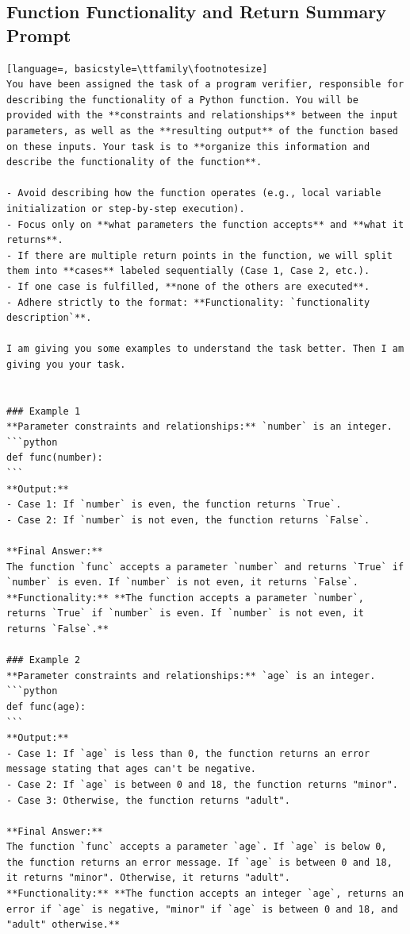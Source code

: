 \documentclass[sigconf]{acmart}
\begin{document}
\subsection{Function Functionality and Return Summary Prompt}
\label{functionality_prompt}
\begin{tcolorbox}[ colback=gray!10, colframe=black, arc=5pt]
\begin{lstlisting}[language=, basicstyle=\ttfamily\footnotesize]
You have been assigned the task of a program verifier, responsible for describing the functionality of a Python function. You will be provided with the **constraints and relationships** between the input parameters, as well as the **resulting output** of the function based on these inputs. Your task is to **organize this information and describe the functionality of the function**.

- Avoid describing how the function operates (e.g., local variable initialization or step-by-step execution).
- Focus only on **what parameters the function accepts** and **what it returns**.
- If there are multiple return points in the function, we will split them into **cases** labeled sequentially (Case 1, Case 2, etc.).
- If one case is fulfilled, **none of the others are executed**.
- Adhere strictly to the format: **Functionality: `functionality description`**.

I am giving you some examples to understand the task better. Then I am giving you your task.


### Example 1  
**Parameter constraints and relationships:** `number` is an integer.  
```python
def func(number):
```
**Output:**  
- Case 1: If `number` is even, the function returns `True`.
- Case 2: If `number` is not even, the function returns `False`.

**Final Answer:**  
The function `func` accepts a parameter `number` and returns `True` if `number` is even. If `number` is not even, it returns `False`.  
**Functionality:** **The function accepts a parameter `number`, returns `True` if `number` is even. If `number` is not even, it returns `False`.**

### Example 2  
**Parameter constraints and relationships:** `age` is an integer.  
```python
def func(age):
```
**Output:**  
- Case 1: If `age` is less than 0, the function returns an error message stating that ages can't be negative.
- Case 2: If `age` is between 0 and 18, the function returns "minor".
- Case 3: Otherwise, the function returns "adult".

**Final Answer:**  
The function `func` accepts a parameter `age`. If `age` is below 0, the function returns an error message. If `age` is between 0 and 18, it returns "minor". Otherwise, it returns "adult".  
**Functionality:** **The function accepts an integer `age`, returns an error if `age` is negative, "minor" if `age` is between 0 and 18, and "adult" otherwise.**


\end{lstlisting}
\end{tcolorbox}
\end{document}

